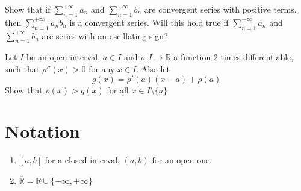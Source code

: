 \documentclass[12pt]{article}
\begin{document}
\begin{ExerciseList}
	\Exercise Show that if $\sum_{n=1}^{+\infty}a_n$ and $\sum_{n=1}^{+\infty}b_n$
	are convergent series with positive terms, then $\sum_{n=1}^{+\infty}a_n b_n$
	is a convergent series. Will this hold true if $\sum_{n=1}^{+\infty}a_n$ and $\sum_{n=1}^{+\infty}b_n$
	are series with an oscillating sign?

	\Exercise Let $I$ be an open interval, $a\in I$ and $\rho\colon I\to\mathbb R$
	a function 2-times differentiable, such that $\rho''(x)>0$ for any $x\in I$. Also let
	$$g(x)=\rho'(a)(x-a)+\rho(a)$$
	Show that $\rho(x)>g(x)$ for all $x\in I\setminus\{ a \}$
\end{ExerciseList}
\section{Notation}
\begin{enumerate}
	\item  $[a,b]$ for a closed interval, $(a,b)$ for an open one.
	\item $\overline{\mathbb R} = \mathbb R \cup \{-\infty, +\infty\}$
\end{enumerate}
\end{document}
